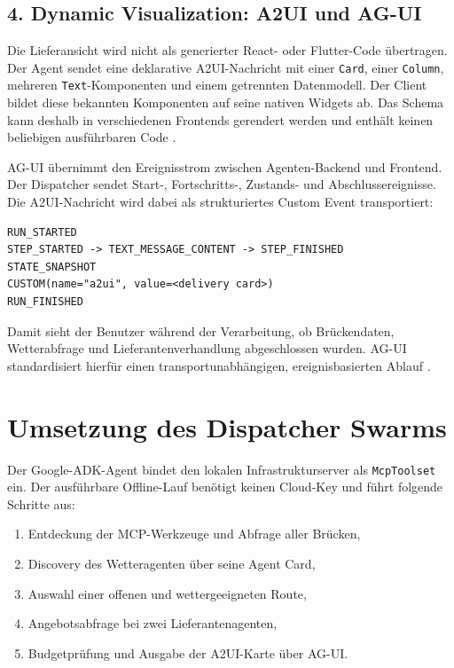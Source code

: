 \documentclass[11pt,a4paper]{article}
\begin{document}
\subsection{4. Dynamic Visualization: A2UI und AG-UI}

Die Lieferansicht wird nicht als generierter React- oder Flutter-Code
übertragen. Der Agent sendet eine deklarative A2UI-Nachricht mit einer
\texttt{Card}, einer \texttt{Column}, mehreren \texttt{Text}-Komponenten und
einem getrennten Datenmodell. Der Client bildet diese bekannten Komponenten
auf seine nativen Widgets ab. Das Schema kann deshalb in verschiedenen
Frontends gerendert werden und enthält keinen beliebigen ausführbaren Code
\cite{a2ui}.

AG-UI übernimmt den Ereignisstrom zwischen Agenten-Backend und Frontend. Der
Dispatcher sendet Start-, Fortschritts-, Zustands- und Abschlussereignisse.
Die A2UI-Nachricht wird dabei als strukturiertes Custom Event transportiert:

\begin{lstlisting}
RUN_STARTED
STEP_STARTED -> TEXT_MESSAGE_CONTENT -> STEP_FINISHED
STATE_SNAPSHOT
CUSTOM(name="a2ui", value=<delivery card>)
RUN_FINISHED
\end{lstlisting}

Damit sieht der Benutzer während der Verarbeitung, ob Brückendaten,
Wetterabfrage und Lieferantenverhandlung abgeschlossen wurden. AG-UI
standardisiert hierfür einen transportunabhängigen, ereignisbasierten
Ablauf \cite{agui}.

\section{Umsetzung des Dispatcher Swarms}

Der Google-ADK-Agent bindet den lokalen Infrastrukturserver als
\texttt{McpToolset} ein. Der ausführbare Offline-Lauf benötigt keinen
Cloud-Key und führt folgende Schritte aus:

\begin{enumerate}
  \item Entdeckung der MCP-Werkzeuge und Abfrage aller Brücken,
  \item Discovery des Wetteragenten über seine Agent Card,
  \item Auswahl einer offenen und wettergeeigneten Route,
  \item Angebotsabfrage bei zwei Lieferantenagenten,
  \item Budgetprüfung und Ausgabe der A2UI-Karte über AG-UI.
\end{enumerate}
\end{document}
